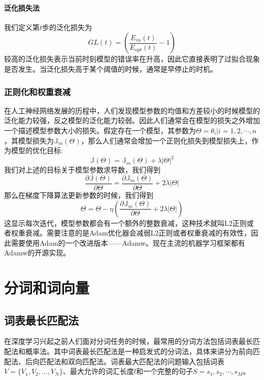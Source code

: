 \documentclass[twoside,a4paper,12pt]{book}%
\begin{document}
\subsubsection{泛化损失法}
我们定义第$t$步的泛化损失为
$$
GL(t)=(\frac{E_{va}(t)}{E_{opt}(t)}-1)
$$
较高的泛化损失表示当前时刻模型的错误率在升高，因此它直接表明了过拟合现象是否发生。当泛化损失高于某个阈值的时候，通常是早停止的时机。


\subsection{正则化和权重衰减}

在人工神经网络发展的历程中，人们发现模型参数的均值和方差较小的时候模型的泛化能力较强，反之模型的泛化能力较弱。因此人们通常会在模型的损失之外增加一个描述模型参数大小的损失。假定存在一个模型，其参数为$\Theta={\theta_i | i=1,2,\cdots,n}$，其模型损失为$\mathbb{J}_m(\Theta)$，那么人们通常会增加一个正则化损失到模型损失上，作为模型的优化目标:
$$
\mathbb{J}(\Theta)=\mathbb{J}_m(\Theta) + \lambda |\Theta|^2
$$
我们对上述的目标关于模型参数求导数，我们得到
$$
\frac{\partial{\mathbb{J}(\Theta)}}{\partial{\Theta}} = \frac{\partial{\mathbb{J}_m(\Theta)}}{\partial{\Theta}} + 2\lambda |\Theta|
$$
那么在梯度下降算法更新参数的时候，我们得到
$$
\Theta = \Theta - \eta( \frac{\partial{\mathbb{J}_m(\Theta)}}{\partial{\Theta}} + 2\lambda |\Theta|)
$$
这显示每次迭代，模型参数都会有一个额外的整数衰减，这种技术就叫L2正则或者权重衰减。需要注意的是Adam优化器会减弱L2正则或者权重衰减的有效性，因此需要使用Adam的一个改进版本——Adamw。现在主流的机器学习框架都有Adamw的开源实现。

\chapter{分词和词向量}

\section{词表最长匹配法}
在深度学习兴起之前人们面对分词任务的时候，最常用的分词方法包括词表最长匹配法和概率法。其中词表最长匹配法是一种启发式的分词法，具体来讲分为前向匹配法、后向匹配法和双向匹配法。词表最大匹配法的问题输入包括词表$V=\{V_1,V_2,\dots,V_N\}$、最大允许的词汇长度$l$和一个完整的句子$S=s_1,s_2,\cdots,s_M$。
\end{document}
